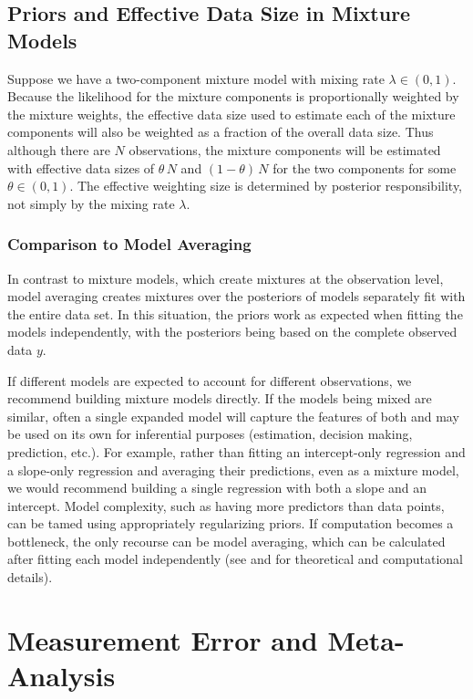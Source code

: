 \section{Priors and Effective Data Size in Mixture Models}

Suppose we have a two-component mixture model with mixing rate
$\lambda \in (0, 1)$.  Because the likelihood for the mixture
components is proportionally weighted by the mixture weights, the
effective data size used to estimate each of the mixture components
will also be weighted as a fraction of the overall data size.  Thus
although there are $N$ observations, the mixture components will be
estimated with effective data sizes of $\theta \, N$ and $(1 - \theta)
\, N$ for the two components for some $\theta \in (0, 1)$.  The
effective weighting size is determined by posterior responsibility,
not simply by the mixing rate $\lambda$.

\subsection{Comparison to Model Averaging}

In contrast to mixture models, which create mixtures at the
observation level, model averaging creates mixtures over the
posteriors of models separately fit with the entire data set.  In this
situation, the priors work as expected when fitting the models
independently, with the posteriors being based on the complete observed
data $y$.

If different models are expected to account for different
observations, we recommend building mixture models directly.  If the
models being mixed are similar, often a single expanded model will
capture the features of both and may be used on its own for
inferential purposes (estimation, decision making, prediction, etc.).
For example, rather than fitting an intercept-only regression and a
slope-only regression and averaging their predictions, even as a
mixture model, we would recommend building a single regression with
both a slope and an intercept.  Model complexity, such as having more
predictors than data points, can be tamed using appropriately
regularizing priors.  If computation becomes a bottleneck, the only
recourse can be model averaging, which can be calculated after fitting
each model independently (see \citep{HoetingEtAl:1999} and
\citep{GelmanEtAl:2013} for theoretical and computational details).


\chapter{Measurement Error and Meta-Analysis}

